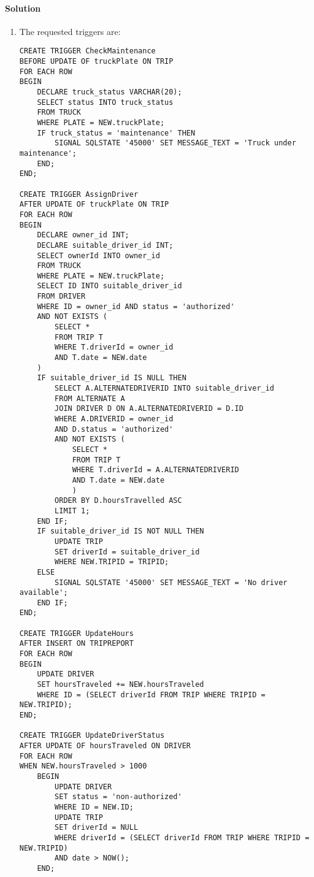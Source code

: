 \paragraph*{Solution}
\begin{enumerate}
    \item The requested triggers are: 
        \begin{lstlisting}[style=SQL]
CREATE TRIGGER CheckMaintenance
BEFORE UPDATE OF truckPlate ON TRIP
FOR EACH ROW
BEGIN
    DECLARE truck_status VARCHAR(20);
    SELECT status INTO truck_status
    FROM TRUCK
    WHERE PLATE = NEW.truckPlate;
    IF truck_status = 'maintenance' THEN
        SIGNAL SQLSTATE '45000' SET MESSAGE_TEXT = 'Truck under maintenance';
    END;
END;

CREATE TRIGGER AssignDriver
AFTER UPDATE OF truckPlate ON TRIP
FOR EACH ROW
BEGIN
    DECLARE owner_id INT;
    DECLARE suitable_driver_id INT;
    SELECT ownerId INTO owner_id
    FROM TRUCK
    WHERE PLATE = NEW.truckPlate;
    SELECT ID INTO suitable_driver_id
    FROM DRIVER
    WHERE ID = owner_id AND status = 'authorized'
    AND NOT EXISTS (
        SELECT *
        FROM TRIP T
        WHERE T.driverId = owner_id
        AND T.date = NEW.date
    )
    IF suitable_driver_id IS NULL THEN
        SELECT A.ALTERNATEDRIVERID INTO suitable_driver_id
        FROM ALTERNATE A
        JOIN DRIVER D ON A.ALTERNATEDRIVERID = D.ID
        WHERE A.DRIVERID = owner_id
        AND D.status = 'authorized'
        AND NOT EXISTS (
            SELECT *
            FROM TRIP T
            WHERE T.driverId = A.ALTERNATEDRIVERID
            AND T.date = NEW.date
            )
        ORDER BY D.hoursTravelled ASC
        LIMIT 1;
    END IF;
    IF suitable_driver_id IS NOT NULL THEN
        UPDATE TRIP
        SET driverId = suitable_driver_id
        WHERE NEW.TRIPID = TRIPID;
    ELSE
        SIGNAL SQLSTATE '45000' SET MESSAGE_TEXT = 'No driver available';
    END IF;
END;

CREATE TRIGGER UpdateHours
AFTER INSERT ON TRIPREPORT
FOR EACH ROW
BEGIN
    UPDATE DRIVER
    SET hoursTraveled += NEW.hoursTraveled
    WHERE ID = (SELECT driverId FROM TRIP WHERE TRIPID = NEW.TRIPID);
END;

CREATE TRIGGER UpdateDriverStatus
AFTER UPDATE OF hoursTraveled ON DRIVER
FOR EACH ROW
WHEN NEW.hoursTraveled > 1000
    BEGIN
        UPDATE DRIVER
        SET status = 'non-authorized'
        WHERE ID = NEW.ID;
        UPDATE TRIP
        SET driverId = NULL
        WHERE driverId = (SELECT driverId FROM TRIP WHERE TRIPID = NEW.TRIPID)
        AND date > NOW();
    END;
        \end{lstlisting}
\end{enumerate}